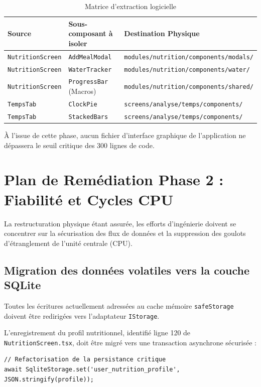 \documentclass[11pt, a4paper]{article}
\begin{document}
\begin{table}[htbp]
\centering
\caption{Matrice d'extraction logicielle}
\label{tab:extraction_matrix}
\begin{tabularx}{\textwidth}{@{}lXl@{}}
\toprule
\textbf{Source} & \textbf{Sous-composant à isoler} & \textbf{Destination Physique} \\ \midrule
\texttt{NutritionScreen} & \texttt{AddMealModal} & \texttt{modules/nutrition/components/modals/} \\
\texttt{NutritionScreen} & \texttt{WaterTracker} & \texttt{modules/nutrition/components/water/} \\
\texttt{NutritionScreen} & \texttt{ProgressBar} (Macros) & \texttt{modules/nutrition/components/shared/} \\
\texttt{TempsTab} & \texttt{ClockPie} & \texttt{screens/analyse/temps/components/} \\
\texttt{TempsTab} & \texttt{StackedBars} & \texttt{screens/analyse/temps/components/} \\ \bottomrule
\end{tabularx}
\end{table}

À l'issue de cette phase, aucun fichier d'interface graphique de l'application ne dépassera le seuil critique des 300 lignes de code.

\newpage

\section{Plan de Remédiation Phase 2 : Fiabilité et Cycles CPU}

La restructuration physique étant assurée, les efforts d'ingénierie doivent se concentrer sur la sécurisation des flux de données et la suppression des goulots d'étranglement de l'unité centrale (CPU).

\subsection{Migration des données volatiles vers la couche SQLite}
Toutes les écritures actuellement adressées au cache mémoire \texttt{safeStorage} doivent être redirigées vers l'adaptateur \texttt{IStorage}.

L'enregistrement du profil nutritionnel, identifié ligne 120 de \texttt{NutritionScreen.tsx}, doit être migré vers une transaction asynchrone sécurisée :
\begin{verbatim}
// Refactorisation de la persistance critique
await SqliteStorage.set('user_nutrition_profile', JSON.stringify(profile));
\end{verbatim}
\end{document}
